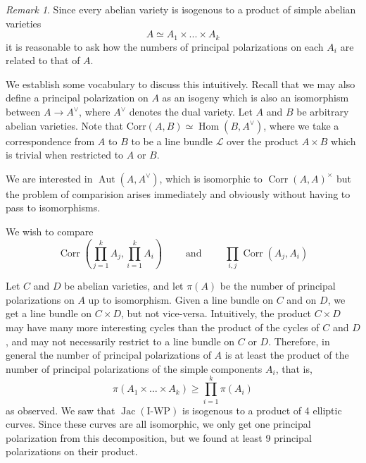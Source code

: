\documentclass[12pt,reqno]{amsart}
\DeclareMathOperator{\Aut}{Aut}
\DeclareMathOperator{\Hom}{Hom}
\DeclareMathOperator{\Jac}{Jac}
\DeclareMathOperator{\Corr}{Corr}
\theoremstyle{definition}
\theoremstyle{remark}
\newtheorem*{remark}{Remark}
\newcommand{\ti}{\todo[inline]}
\begin{document}
\begin{remark} Since every abelian variety is isogenous to a product of simple abelian varieties $$A \simeq A_1 \times ... \times A_k$$ it is reasonable to ask how the numbers of principal polarizations on each $A_i$ are related to that of $A$. 

We establish some vocabulary to discuss this intuitively. Recall that we may also define a principal polarization on $A$ as an isogeny which is also an isomorphism between $A \to A^\vee$, where $A^\vee$ denotes the dual variety. Let $A$ and $B$ be arbitrary abelian varieties. Note that $\text{Corr}(A, B) \simeq \Hom(B, A^\vee)$, where we take a correspondence from $A$ to $B$ to be a line bundle $\mathcal{L}$ over the product $A \times B$ which is trivial when restricted to $A$ or $B$.

We are interested in $\Aut(A, A^\vee)$, which is isomorphic to $\Corr(A, A)^\times$ but the problem of comparision arises immediately and obviously without having to pass to isomorphisms. %

We wish to compare $$\Corr\left(\prod_{j= 1}^k A_j, \prod_{i= 1}^k A_i\right) \qquad \text{ and  } \qquad \prod_{i, j} \Corr(A_j, A_i)$$

Let $C$ and $D$ be abelian varieties, and let $\pi(A)$ be the number of principal polarizations on $A$ up to isomorphism. Given a line bundle on $C$ and on $D$, we get a line bundle on $C \times D$, but not vice-versa. Intuitively, the product $C \times D$ may have many more interesting cycles than the product of the cycles of $C$ and $D$, and may not necessarily restrict to a line bundle on $C$ or $D$. Therefore, in general the number of principal polarizations of $A$ is at least the product of the number of principal polarizations of the simple components $A_i$, that is, $$\pi(A_1 \times \ldots \times A_k) \geq \prod_{i=1}^k \pi(A_i)$$ as observed. We saw that $\Jac(\text{I-WP})$ is isogenous to a product of 4 elliptic curves. Since these curves are all isomorphic, we only get one principal polarization from this decomposition, but we found at least 9 principal polarizations on their product.
\end{remark} 

\end{document}
